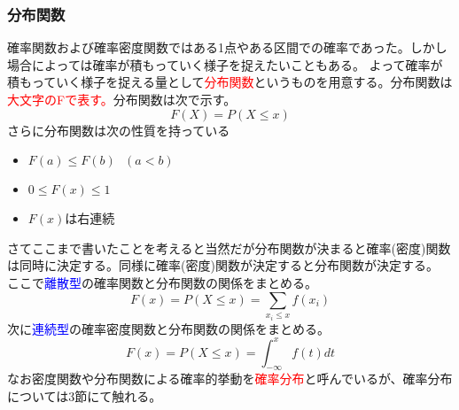 \documentclass[a4paper,10pt]{jarticle}
\begin{document}
\subsubsection{分布関数}
確率関数および確率密度関数ではある1点やある区間での確率であった。しかし場合によっては確率が積もっていく様子を捉えたいこともある。
よって確率が積もっていく様子を捉える量として\textcolor{red}{分布関数}というものを用意する。分布関数は\textcolor{red}{大文字のFで表す。}分布関数は次で示す。
\begin{equation}
    F(X)=P(X\leq x)\tag{2,7}
\end{equation}
さらに分布関数は次の性質を持っている
\begin{itemize}
    \item $F(a)\leq F(b) \ \ \ (a<b)$
    \item $0\leq F(x) \leq 1$
    \item $F(x)$は右連続
\end{itemize}
さてここまで書いたことを考えると当然だが分布関数が決まると確率(密度)関数は同時に決定する。同様に確率(密度)関数が決定すると分布関数が決定する。
ここで\textcolor{blue}{離散型}の確率関数と分布関数の関係をまとめる。
\begin{equation}
    F(x) = P(X\leq x) =\sum_{x_i\leq x}f(x_i)\tag{2,8}
\end{equation}
次に\textcolor{blue}{連続型}の確率密度関数と分布関数の関係をまとめる。
\begin{equation}
    F(x) = P(X\leq x) = \int_{-\infty}^x f(t)dt\tag{2,9}
\end{equation}
なお密度関数や分布関数による確率的挙動を\textcolor{red}{確率分布}と呼んでいるが、確率分布については3節にて触れる。
\end{document}
